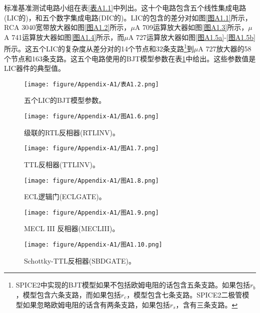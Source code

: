 标准基准测试电路小组在表\ref{表A1.1}中列出。这十个电路包含五个线性集成电路(LIC的)，和五个数字集成电路(DIC的)。LIC的包含的差分对如图\ref{图A1.1}所示，RCA 3040宽带放大器如图\ref{图A1.2}所示，$\mu$A 709运算放大器如图\ref{图A1.3}所示，$\mu$A 741运算放大器如图\ref{图A1.4}所示，而$\mu$A 727运算放大器如图\ref{图A1.5a}-\ref{图A1.5b}所示。这五个LIC的复杂度从差分对的14个节点和32条支路\footnote{SPICE2中实现的BJT模型如果不包括欧姆电阻的话包含五条支路。如果包括$r_b$，模型包含六条支路，而如果包括$r_c$，模型包含七条支路。SPICE2二极管模型如果忽略欧姆电阻的话含有两条支路，如果包括$r_s$，含有三条支路。}到$\mu$A 727放大器的58个节点和163条支路。这五个电路使用的BJT模型参数在表\ref{表A1.2}中给出。这些参数值是LIC器件的典型值。

\begin{figure}[htbp]
\small
    \centering
    \texttt{[image: figure/Appendix-A1/表A1.2.png]}
    \caption{五个LIC的BJT模型参数。}
    \label{表A1.2}
\end{figure}

\begin{figure}[htbp]
\small
    \centering
    \texttt{[image: figure/Appendix-A1/图A1.6.png]}
    \caption{级联的RTL反相器(RTLINV)。}
    \label{图A1.6}
\end{figure}

\begin{figure}[htbp]
\small
    \centering
    \texttt{[image: figure/Appendix-A1/图A1.7.png]}
    \caption{TTL反相器(TTLINV)。}
    \label{图A1.7}
\end{figure}

\begin{figure}[htbp]
\small
    \centering
    \texttt{[image: figure/Appendix-A1/图A1.8.png]}
    \caption{ECL逻辑门(ECLGATE)。}
    \label{图A1.8}
\end{figure}

\begin{figure}[htbp]
\small
    \centering
    \texttt{[image: figure/Appendix-A1/图A1.9.png]}
    \caption{MECL III 反相器(MECLIII)。}
    \label{图A1.9}
\end{figure}

\begin{figure}[htbp]
\small
    \centering
    \texttt{[image: figure/Appendix-A1/图A1.10.png]}
    \caption{Schottky-TTL反相器(SBDGATE)。}
    \label{图A1.10}
\end{figure}

